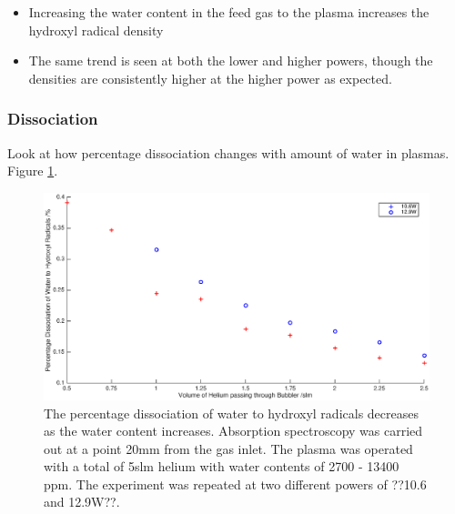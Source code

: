 \documentclass[11pt, oneside]{article}   	%
\begin{document}
\begin{itemize}
    \item Increasing the water content in the feed gas to the plasma increases the hydroxyl radical density
    \item The same trend is seen at both the lower and higher powers, though the densities are consistently higher at the higher power as expected. 
\end{itemize}

\subsubsection{Dissociation}

Look at how percentage dissociation changes with amount of water in plasmas. Figure \ref{fig:BubblerDissociation}.

\begin{figure}
    \centering
    \includegraphics[width=\textwidth]{Figures/BubblerDissociation.eps}
    \caption{The percentage dissociation of water to hydroxyl radicals decreases as the water content increases. Absorption spectroscopy was carried out at a point 20mm from the gas inlet. The plasma was operated with a total of 5slm helium with water contents of 2700 - 13400 ppm. The experiment was repeated at two different powers of ??10.6 and 12.9W??.}
    \label{fig:BubblerDissociation}
\end{figure}
\end{document}

